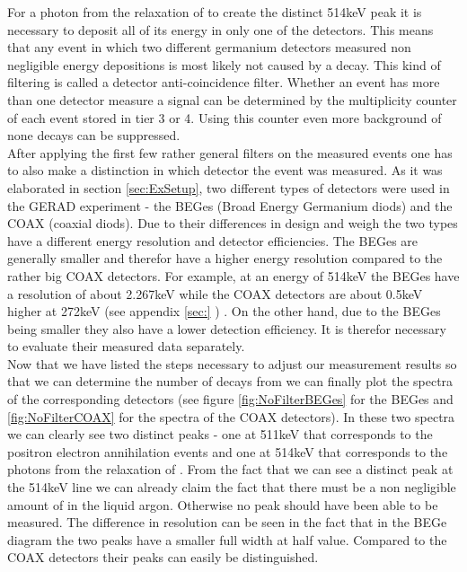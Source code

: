 For a photon from the relaxation of  to create the distinct 514keV peak it is necessary to deposit all of its energy in only one of the detectors. 
This means that any event in which two different germanium detectors measured non negligible energy depositions is most likely not caused by a \Kr decay.
This kind of filtering is called a detector anti-coincidence filter.
Whether an event has more than one detector measure a signal can be determined by the multiplicity counter of each event stored in tier 3 or 4.
Using this counter even more background of none \Kr decays can be suppressed.
\\

After applying the first few rather general filters on the measured events one has to also make a distinction in which detector the event was measured.
As it was elaborated in section \ref{sec:ExSetup}, two different types of detectors were used in the GERAD experiment - the BEGes (Broad Energy Germanium diods) and the COAX (coaxial diods). 
Due to their differences in design and weigh the two types have a different energy resolution and detector efficiencies. 
The BEGes are generally smaller and therefor have a higher energy resolution compared to the rather big COAX detectors.
For example, at an energy of 514keV the BEGes have a resolution of about 2.267keV while the COAX detectors are about 0.5keV higher at 272keV (see appendix \ref{sec:} ) \cite{agostini_background_2017}. 
On the other hand, due to the BEGes being smaller they also have a lower detection efficiency.
It is therefor necessary to evaluate their measured data separately.
\\

Now that we have listed the steps necessary to adjust our measurement results so that we can determine the number of decays from we can finally plot the spectra of the corresponding detectors (see figure \ref{fig:NoFilterBEGes} for the BEGes and \ref{fig:NoFilterCOAX} for the spectra of the COAX detectors). 
In these two spectra we can clearly see two distinct peaks - one at 511keV that corresponds to the positron electron annihilation events and one at 514keV that corresponds to the photons from the relaxation of .
From the fact that we can see a distinct peak at the 514keV line we can already claim the fact that there must be a non negligible amount of \Kr in the liquid argon.
Otherwise no peak should have been able to be measured. 
The difference in resolution can be seen in the fact that in the BEGe diagram the two peaks have a smaller full width at half value.
Compared to the COAX detectors their peaks can easily be distinguished.  
\\

